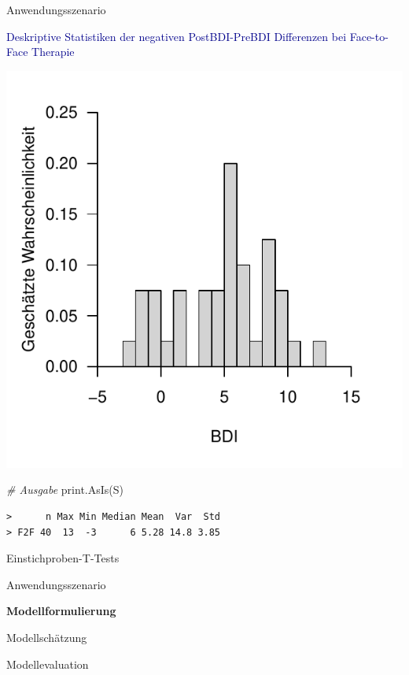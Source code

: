 \documentclass[
  8pt,
  ignorenonframetext,
]{beamer}
\newenvironment{Shaded}{\begin{snugshade}}{\end{snugshade}}
\newcommand{\CommentTok}[1]{\textcolor[rgb]{0.56,0.35,0.01}{\textit{#1}}}
\newcommand{\FunctionTok}[1]{\textcolor[rgb]{0.00,0.00,0.00}{#1}}
\newcommand{\NormalTok}[1]{#1}
\begin{document}
\begin{frame}[fragile]{Anwendungsszenario}
\protect\hypertarget{anwendungsszenario-5}{}
\small
\vspace{2mm}

\textcolor{darkblue}{Deskriptive Statistiken der negativen PostBDI-PreBDI Differenzen bei Face-to-Face Therapie}
\vspace{1mm}

\begin{center}\includegraphics[width=0.45\linewidth]{9_Abbildungen/alm_9_F2F_histogramm} \end{center}

\footnotesize

\begin{Shaded}
\begin{Highlighting}[]
\CommentTok{\# Ausgabe}
\FunctionTok{print.AsIs}\NormalTok{(S)}
\end{Highlighting}
\end{Shaded}

\begin{verbatim}
>      n Max Min Median Mean  Var  Std
> F2F 40  13  -3      6 5.28 14.8 3.85
\end{verbatim}
\end{frame}

\begin{frame}{Einstichproben-T-Tests}
\protect\hypertarget{einstichproben-t-tests-2}{}
\large
{}
\vfill

Anwendungsszenario

\textbf{Modellformulierung}

Modellschätzung

Modellevaluation \vfill
\end{frame}
\end{document}

